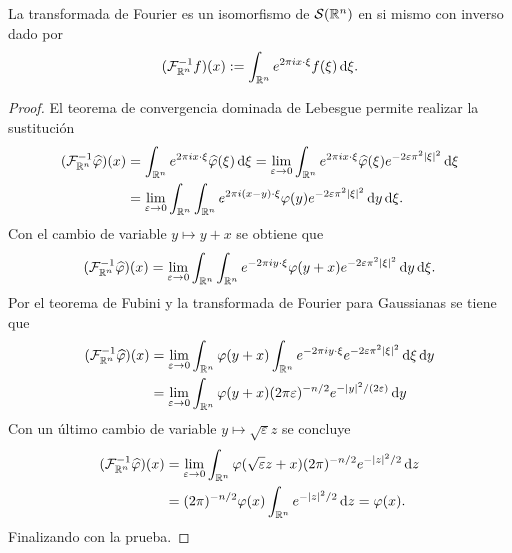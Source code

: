 \begin{theorem}
    La transformada de Fourier es un isomorfismo de $\mathcal{S}(\mathbb{R}^n)$ en si 
    mismo con inverso dado por 
    \begin{equation*}
        (\mathcal{F}^{-1}_{\mathbb{R}^n}f)(x) := \int_{\mathbb{R}^n} e^{2\pi i x \cdot \xi} f(\xi)
        \mathop{}\!\mathrm{d} \xi.
    \end{equation*}
\end{theorem}
\begin{proof}
    El teorema de convergencia dominada de Lebesgue permite realizar la 
    sustitución
    \begin{align*}
        (\mathcal{F}^{-1}_{\mathbb{R}^n}\widehat{\varphi})(x) &= 
        \int_{\mathbb{R}^n}e^{2\pi ix \cdot \xi} \widehat{\varphi}(\xi)\mathop{}\!\mathrm{d} \xi
        = \lim_{\varepsilon\rightarrow0} 
        \int_{\mathbb{R}^n}e^{2\pi ix \cdot \xi} \widehat{\varphi}(\xi)
        e^{-2\varepsilon\pi^2|\xi|^2} \mathop{}\!\mathrm{d} \xi \\
        &= \lim_{\varepsilon\rightarrow0} \int_{\mathbb{R}^n}
        \int_{\mathbb{R}^n}e^{2\pi i(x-y) \cdot \xi} \varphi(y)
        e^{-2\varepsilon\pi^2|\xi|^2} \mathop{}\!\mathrm{d} y \mathop{}\!\mathrm{d} \xi.
    \end{align*}
    Con el cambio de variable $y \mapsto y+x$ se obtiene que
    \begin{equation*}
        (\mathcal{F}^{-1}_{\mathbb{R}^n}\widehat{\varphi})(x) = 
        \lim_{\varepsilon\rightarrow0} \int_{\mathbb{R}^n}
        \int_{\mathbb{R}^n}e^{-2\pi iy \cdot \xi} \varphi(y+x)
        e^{-2\varepsilon\pi^2|\xi|^2} \mathop{}\!\mathrm{d} y \mathop{}\!\mathrm{d} \xi.
    \end{equation*}
    Por el teorema de Fubini y la transformada de Fourier para 
    Gaussianas se tiene que
    \begin{align*}
        (\mathcal{F}^{-1}_{\mathbb{R}^n}\widehat{\varphi})(x) &= 
        \lim_{\varepsilon\rightarrow0} \int_{\mathbb{R}^n} \varphi(y+x) 
        \int_{\mathbb{R}^n}e^{-2\pi iy \cdot \xi} 
        e^{-2\varepsilon\pi^2|\xi|^2}  \mathop{}\!\mathrm{d} \xi \mathop{}\!\mathrm{d} y \\
        & = \lim_{\varepsilon\rightarrow0} \int_{\mathbb{R}^n} \varphi(y+x) 
        (2\pi\varepsilon)^{-n/2} e^{-|y|^2/(2\varepsilon)} \mathop{}\!\mathrm{d} y
    \end{align*}
    Con un último cambio de variable $y\mapsto\sqrt{\varepsilon}z$
    se concluye 
    \begin{align*}
        (\mathcal{F}^{-1}_{\mathbb{R}^n}\widehat{\varphi})(x) &= 
        \lim_{\varepsilon\rightarrow0} \int_{\mathbb{R}^n} \varphi(\sqrt{\varepsilon}z+x) 
        (2\pi)^{-n/2} e^{-|z|^2/2} \mathop{}\!\mathrm{d} z \\
        & = (2\pi)^{-n/2} \varphi(x) \int_{\mathbb{R}^n}e^{-|z|^2/2} \mathop{}\!\mathrm{d} z = \varphi(x).
    \end{align*}
    Finalizando con la prueba.
\end{proof}
